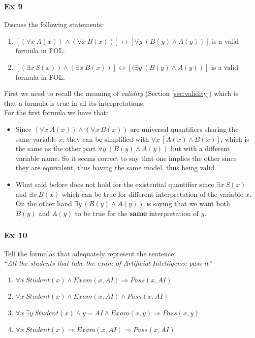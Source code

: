 \documentclass[10pt,a4paper]{article}
\begin{document}
\begin{itemize}
\subsubsection{Ex 9}
Discuss the following statements:
\begin{enumerate}
\item $[(\forall x\ A(x))\wedge(\forall x\ B(x))]\leftrightarrow [\forall y\ (B(y)\wedge A(y))]$ is a valid formula in FOL.
\item $[(\exists x\ S(x))\wedge (\exists x\ B(x))]\leftrightarrow[(\exists y\ (B(y)\wedge A(y))]$ is a valid formula in FOL.
\end{enumerate}
First we need to recall the meaning of \textit{validity} (Section \ref{sec:validity}) which is that a formula is true in all its interpretations.\\
For the first formula we have that:
\begin{itemize}
\item Since $(\forall x\ A(x))\wedge(\forall x\ B(x))$ are universal quantifiers sharing the same variable $x$, they can be simplified with $\forall x\ [A(x)\wedge B(x)]$, which is the same as the other part $\forall y\ (B(y)\wedge A(y))$ but with a different variable name. So it seems correct to  say that one implies the other since they are equivalent, thus having the same model, thus being valid.

\item What said before does not hold for the existential quantifier since $\exists x\ S(x)$ and $\exists x\ B(x)$ which can be true for different interpretation of the variable $x$. On the other hand $\exists y\ (B(y)\wedge A(y))$ is saying that we want both $B(y)$ and $A(y)$ to be true for the \textbf{same} interpretation of $y$.
\end{itemize}


\subsubsection{Ex 10}
Tell the formulas that adequately represent the sentence:\\
\textit{“All the students that take the exam of Artificial Intelligence pass it”}
\begin{enumerate}
\item $\forall x\ Student(x)\wedge Exam(x, AI)\Rightarrow Pass(x,AI)$
\item $\forall x\ Student(x)\wedge Exam(x, AI)\wedge Pass(x,AI)$
\item $\forall x\ \exists y\ Student(x)\wedge y=AI \wedge  Exam(x,y)\Rightarrow Pass(x,y)$
\item $\forall x\ Student(x)\Rightarrow Exam(x, AI)\Rightarrow Pass(x,AI)$


\end{enumerate}
\end{itemize}
\end{document}
